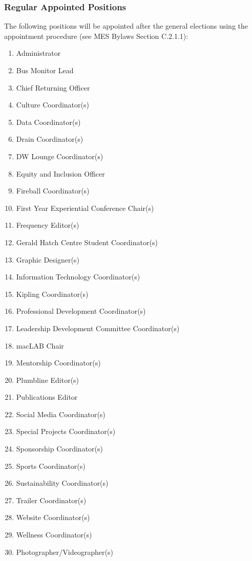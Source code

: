 \hypertarget{regular-appointed-positions}{%
 \subsubsection{Regular Appointed
  Positions}
 \label{regular-appointed-positions}}
The following positions will be appointed after the general elections
using the appointment procedure (see MES Bylaws Section C.2.1.1):

\begin{enumerate}
 \item
  Administrator
 \item
  Bus Monitor Lead
 \item
  Chief Returning Officer
 \item
  Culture Coordinator(s)
 \item
  Data Coordinator(s)
 \item
  Drain Coordinator(s)
 \item
  DW Lounge Coordinator(s)
 \item
  Equity and Inclusion Officer
 \item
  Fireball Coordinator(s)
 \item
  First Year Experiential Conference Chair(s)
 \item
  Frequency Editor(s)
 \item
  Gerald Hatch Centre Student Coordinator(s)
 \item
  Graphic Designer(s)
 \item
  Information Technology Coordinator(s)
 \item
  Kipling Coordinator(s)
 \item
  Professional Development Coordinator(s)
 \item
  Leadership Development Committee Coordinator(s)
 \item
  macLAB Chair
 \item
  Mentorship Coordinator(s)
 \item
  Plumbline Editor(s)
 \item
  Publications Editor
 \item
  Social Media Coordinator(s)
 \item
  Special Projects Coordinator(s)
 \item
  Sponsorship Coordinator(s)
 \item
  Sports Coordinator(s)
 \item
  Sustainability Coordinator(s)
 \item
  Trailer Coordinator(s)
 \item
  Website Coordinator(s)
 \item
  Wellness Coordinator(s)
 \item
  Photographer/Videographer(s)
\end{enumerate}

